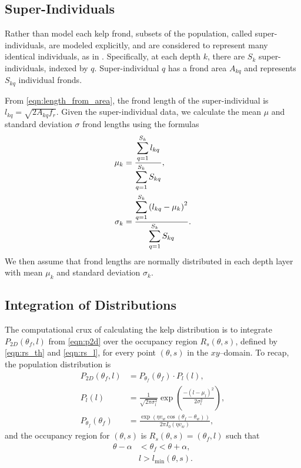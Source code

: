 \subsection{Super-Individuals}
\label{sec:si}

Rather than model each kelp frond, subsets of the population, called super-individuals, are modeled explicitly, and are considered to represent many identical individuals, as in \citep{scheffer_super-individuals_1994}.
Specifically, at each depth $k$, there are $S_k$ super-individuals, indexed by $q$.
Super-individual $q$ has a frond area $A_{kq}$ and represents $S_{kq}$ individual fronds.

From \eqref{eqn:length_from_area}, the frond length of the super-individual is $l_{kq} = \sqrt{2A_{kq}f_r}$.
Given the super-individual data, we calculate the mean $\mu$ and standard deviation $\sigma$ frond
lengths using the formulas
\begin{align}
  \mu_k &= \frac{\displaystyle \sum_{q=1}^{S_k} l_{kq}}{\displaystyle \sum_{q=1}^{S_k} S_{kq}},
  \label{eqn:si_mean} \\
  \sigma_k &= \frac{\displaystyle \sum_{q=1}^{S_k} \left( l_{kq} - \mu_k \right)^2}{\displaystyle \sum_{q=1}^{S_k} S_{kq}}.
  \label{eqn:si_std}
\end{align}
We then assume that frond lengths are normally distributed in each depth layer
with mean $\mu_k$ and standard deviation $\sigma_k$.

\subsection{Integration of Distributions}
The computational crux of calculating the kelp distribution is to integrate $P_{2D}(\theta_f, l)$ from \eqref{eqn:p2d} over the occupancy region $R_s(\theta, s)$, defined by \eqref{eqn:rs_th} and \eqref{eqn:rs_l}, for every point $(\theta,s)$ in the $xy$--domain.
To recap, the population distribution is
\begin{align*}
	P_{2D}(\theta_f,l) &= P_{\theta_f}(\theta_f) \cdot P_l(l), \\
  P_l(l) &= \frac{1}{\sqrt{2\pi\sigma_l^2}}\exp\left(\frac{-(l-\mu_l)^2}{2\sigma_l^2}\right), \\
	P_{\theta_f}(\theta_f) &= \frac{\exp\left(\eta v_w\cos(\theta_f-\theta_w)\right)}{2\pi I_0(\eta v_w)},
\end{align*}
and the occupancy region for $(\theta, s)$ is $R_s(\theta, s) = (\theta_f, l)$ such that
\begin{align*}
	\theta - \alpha &< \theta_f < \theta + \alpha, \\
	&l > l_{\min}(\theta,s).
\end{align*}


